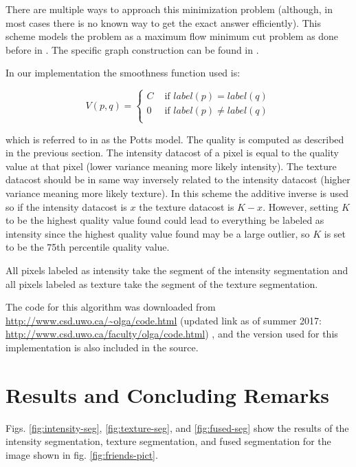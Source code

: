 \documentclass[twocolumn]{article}
\begin{document}
There are multiple ways to approach this minimization problem
(although, in most cases there is no known way to get the
exact answer efficiently). This scheme models the problem as a
maximum flow minimum cut problem as done before in \cite{prev}. The
specific graph construction can be found in \cite{fusion1}. 

In our implementation the smoothness function used is: 

\begin{equation*}
V(p,q) = \begin{cases}
C&\text{ if $label(p)=label(q)$}\\
0&\text{ if $label(p) \neq label(q)$}\\
\end{cases}
\end{equation*}


which is referred to in \cite{fusion1} as the Potts model. The quality is
computed as described in the previous section. The intensity datacost
of a pixel is equal to the quality value at that pixel (lower variance
meaning more likely intensity). The texture datacost should be in same
way inversely related to the intensity datacost (higher variance
meaning more likely texture). In this scheme the additive inverse is
used so if the intensity datacost is $x$ the texture datacost is
$K-x$. However, setting $K$ to be the highest quality value found could lead
to everything be labeled as intensity since the highest quality value
found may be a large outlier, so $K$ is set to be the 75th percentile
quality value.    

All pixels labeled as intensity take the segment of the 
intensity segmentation and all pixels labeled as texture take the
segment of the texture segmentation. 

The code for this algorithm was downloaded from 
\url{http://www.csd.uwo.ca/~olga/code.html} (updated 
link as of summer 2017: \url{http://www.csd.uwo.ca/faculty/olga/code.html})
, and the version used for this implementation is also 
included in the source.   

\section{Results and Concluding Remarks}

Figs. \ref{fig:intensity-seg}, \ref{fig:texture-seg}, and \ref{fig:fused-seg}
show the results of the intensity segmentation,
texture segmentation, and fused segmentation for the image shown in
fig. \ref{fig:friends-pict}.
\end{document}
